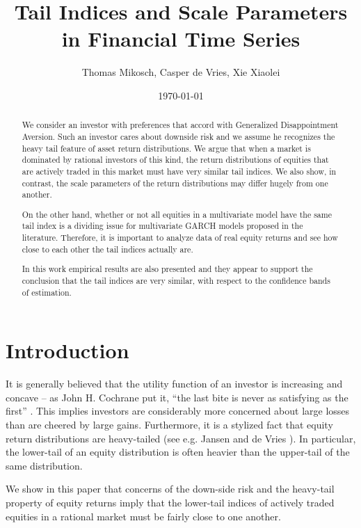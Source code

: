 \documentclass{article}
\title{Tail Indices and Scale Parameters in Financial Time Series}
\author{Thomas Mikosch, Casper de Vries, Xie Xiaolei}
\date{\today}
\begin{document}
\maketitle

\begin{abstract}
We consider an investor with preferences that accord with Generalized
Disappointment Aversion. Such an investor cares about downside risk and
we assume he recognizes the heavy tail feature of asset return
distributions. We argue that when a market is dominated by rational
investors of this kind, the return distributions of equities that are
actively traded in this market must have very similar tail indices. We
also show, in contrast, the scale parameters of the return
distributions may differ hugely from one another.

On the other hand, whether or not all equities in a multivariate model
have the same tail index is a dividing issue for multivariate GARCH
models proposed in the literature. Therefore, it is important to analyze
data of real equity returns and see how close to each other the
tail indices actually are.

In this work empirical results are also presented and they appear
to support the conclusion that the tail indices are very similar,
with respect to the confidence bands of estimation.
\end{abstract}

\section{Introduction}
It is generally believed that the utility function of an
investor is increasing and concave -- as John H. Cochrane
put it, ``the last bite is never as satisfying as the first''
\cite{cochrane2009asset}. This implies investors are considerably
more concerned about large losses than are cheered by large gains.
Furthermore, it is a stylized fact that equity return distributions
are heavy-tailed (see e.g. Jansen and de Vries \cite{jansen1991frequency}).
In particular, the lower-tail of an equity distribution is often heavier
than the upper-tail of the same distribution.

We show in this paper that concerns of the down-side risk and the
heavy-tail property of equity returns  imply that the lower-tail indices
of actively traded equities in a rational market must be fairly close to
one another.

\end{document}

